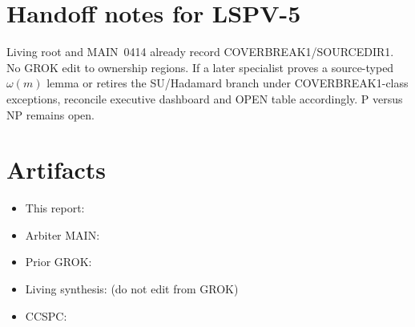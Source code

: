 \documentclass[11pt]{article}
\begin{document}
\section*{Handoff notes for LSPV-5}
Living root and MAIN~0414 already record COVERBREAK1/SOURCEDIR1. No GROK edit to ownership
regions. If a later specialist proves a source-typed $\omega(m)$ lemma or retires the SU/Hadamard
branch under COVERBREAK1-class exceptions, reconcile executive dashboard and OPEN table
accordingly. P versus NP remains open.

\section*{Artifacts}
\begin{itemize}
\item This report: 
\item Arbiter MAIN: 
\item Prior GROK: 
\item Living synthesis:  (do not edit from GROK)
\item CCSPC: 
\end{itemize}

\end{document}
